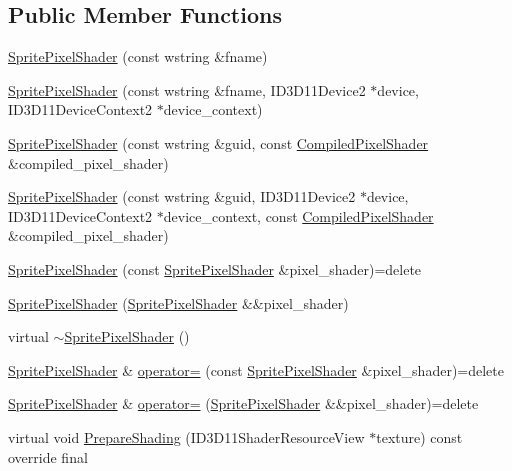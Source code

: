 \subsection*{Public Member Functions}
\begin{DoxyCompactItemize}
\item 
\hyperlink{classmage_1_1_sprite_pixel_shader_a177d1f15a6230f079862967b9c3bdeaa}{Sprite\+Pixel\+Shader} (const wstring \&fname)
\item 
\hyperlink{classmage_1_1_sprite_pixel_shader_ad2d798e4235dd51e3536309709b003ff}{Sprite\+Pixel\+Shader} (const wstring \&fname, I\+D3\+D11\+Device2 $\ast$device, I\+D3\+D11\+Device\+Context2 $\ast$device\+\_\+context)
\item 
\hyperlink{classmage_1_1_sprite_pixel_shader_a1c9e2ba4b4e14c0875ad38f379ce5c89}{Sprite\+Pixel\+Shader} (const wstring \&guid, const \hyperlink{structmage_1_1_compiled_pixel_shader}{Compiled\+Pixel\+Shader} \&compiled\+\_\+pixel\+\_\+shader)
\item 
\hyperlink{classmage_1_1_sprite_pixel_shader_ab73687a6f86ecfd9337a8aa8caf67dfb}{Sprite\+Pixel\+Shader} (const wstring \&guid, I\+D3\+D11\+Device2 $\ast$device, I\+D3\+D11\+Device\+Context2 $\ast$device\+\_\+context, const \hyperlink{structmage_1_1_compiled_pixel_shader}{Compiled\+Pixel\+Shader} \&compiled\+\_\+pixel\+\_\+shader)
\item 
\hyperlink{classmage_1_1_sprite_pixel_shader_a5803ea69e04c58528f9c4fbbc0f4efbc}{Sprite\+Pixel\+Shader} (const \hyperlink{classmage_1_1_sprite_pixel_shader}{Sprite\+Pixel\+Shader} \&pixel\+\_\+shader)=delete
\item 
\hyperlink{classmage_1_1_sprite_pixel_shader_a1507191b6574cc1fb499b4995f73edfe}{Sprite\+Pixel\+Shader} (\hyperlink{classmage_1_1_sprite_pixel_shader}{Sprite\+Pixel\+Shader} \&\&pixel\+\_\+shader)
\item 
virtual \hyperlink{classmage_1_1_sprite_pixel_shader_a0e2a3f2b52417ebffc56db3739bdd0c2}{$\sim$\+Sprite\+Pixel\+Shader} ()
\item 
\hyperlink{classmage_1_1_sprite_pixel_shader}{Sprite\+Pixel\+Shader} \& \hyperlink{classmage_1_1_sprite_pixel_shader_adf6e6f0872406b9df46cb87731ed1ae0}{operator=} (const \hyperlink{classmage_1_1_sprite_pixel_shader}{Sprite\+Pixel\+Shader} \&pixel\+\_\+shader)=delete
\item 
\hyperlink{classmage_1_1_sprite_pixel_shader}{Sprite\+Pixel\+Shader} \& \hyperlink{classmage_1_1_sprite_pixel_shader_ad982c266c5ba3510009a3f5e7519e284}{operator=} (\hyperlink{classmage_1_1_sprite_pixel_shader}{Sprite\+Pixel\+Shader} \&\&pixel\+\_\+shader)=delete
\item 
virtual void \hyperlink{classmage_1_1_sprite_pixel_shader_a8c0c4daf36c74822a772b1a38e8d876a}{Prepare\+Shading} (I\+D3\+D11\+Shader\+Resource\+View $\ast$texture) const override final
\end{DoxyCompactItemize}
